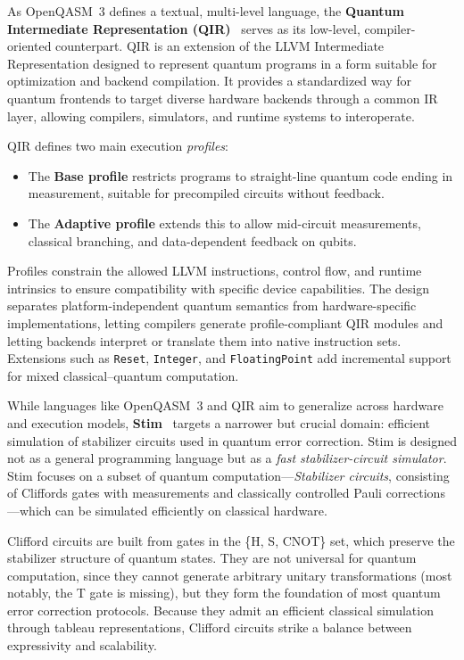 As OpenQASM~3 defines a textual, multi-level language, the \textbf{Quantum Intermediate Representation (QIR)}~\cite{qir-spec} serves as its low-level, compiler-oriented counterpart. 
QIR is an extension of the LLVM Intermediate Representation designed to represent quantum programs in a form suitable for optimization and backend compilation. 
It provides a standardized way for quantum frontends to target diverse hardware backends through a common IR layer, allowing compilers, simulators, and runtime systems to interoperate.

QIR defines two main execution \emph{profiles}:
\begin{itemize}
  \item The \textbf{Base profile} restricts programs to straight-line quantum code ending in measurement, suitable for precompiled circuits without feedback.
  \item The \textbf{Adaptive profile} extends this to allow mid-circuit measurements, classical branching, and data-dependent feedback on qubits.
\end{itemize}
Profiles constrain the allowed LLVM instructions, control flow, and runtime intrinsics to ensure compatibility with specific device capabilities. 
The design separates platform-independent quantum semantics from hardware-specific implementations, letting compilers generate profile-compliant QIR modules and letting backends interpret or translate them into native instruction sets. 
Extensions such as \texttt{Reset}, \texttt{Integer}, and \texttt{FloatingPoint} add incremental support for mixed classical–quantum computation.

\vspace{2em}

While languages like OpenQASM~3 and QIR aim to generalize across hardware and execution models, \textbf{Stim}~\cite{gidney2021stim} targets a narrower but crucial domain: efficient simulation of stabilizer circuits used in quantum error correction.
Stim is designed not as a general programming language but as a \emph{fast stabilizer-circuit simulator}. 
Stim focuses on a subset of quantum computation—\emph{Stabilizer circuits}, consisting of Cliffords gates with measurements and classically controlled Pauli corrections—which can be simulated efficiently on classical hardware.

Clifford circuits are built from gates in the \{H, S, CNOT\} set, which preserve the stabilizer structure of quantum states. 
They are not universal for quantum computation, since they cannot generate arbitrary unitary transformations (most notably, the T gate is missing), but they form the foundation of most quantum error correction protocols. 
Because they admit an efficient classical simulation through tableau representations, Clifford circuits strike a balance between expressivity and scalability.

